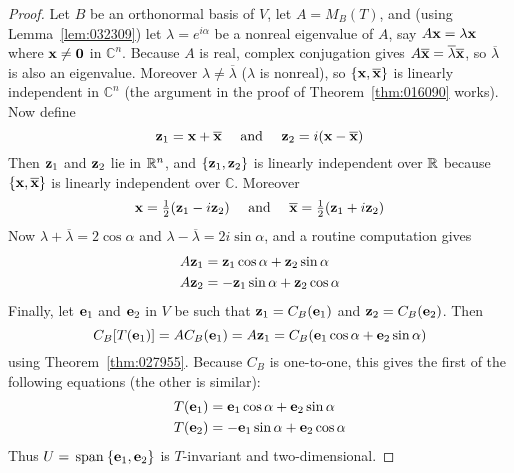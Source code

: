 \begin{proof}
Let $B$ be an orthonormal basis of $V$, let $A = M_{B}(T)$, and (using Lemma~\ref{lem:032309}) let $\lambda = e^{i\alpha}$ be a nonreal eigenvalue of $A$, say $A\textbf{x} = \lambda\textbf{x}$ where $\textbf{x} \neq \textbf{0}$ in $\mathbb{C}^n$. Because $A$ is real, complex conjugation gives $A\overline{\textbf{x}} = \overline{\lambda} \overline{\textbf{x}}$, so $ \overline{\lambda} $ is also an eigenvalue. Moreover $ \lambda \neq \overline{\lambda} $ ($\lambda$ is nonreal), so $ \{\textbf{x}, \overline{\textbf{x}} \} $ is linearly independent in $\mathbb{C}^n$ (the argument in the proof of Theorem~\ref{thm:016090} works). Now define
\begin{equation*}
\textbf{z}_1 = \textbf{x} + \overline{\textbf{x}} \quad \mbox{ and } \quad \textbf{z}_2 = i(\textbf{x} - \overline{\textbf{x}})
\end{equation*}
Then $\textbf{z}_{1}$ and $\textbf{z}_{2}$ lie in $\mathbb{R}^n$, and $\{\textbf{z}_{1}, \textbf{z}_{2}\}$ is linearly independent over $\mathbb{R}$ because $ \{\textbf{x}, \overline{\textbf{x}} \} $ is linearly independent over $\mathbb{C}$. Moreover
\begin{equation*}
\textbf{x} = \tfrac{1}{2} (\textbf{z}_1 - i \textbf{z}_2) \quad \mbox{ and } \quad \overline{\textbf{x}} = \tfrac{1}{2} (\textbf{z}_1 + i\textbf{z}_2)
\end{equation*}
Now $ \lambda + \overline{\lambda} = 2 \cos \alpha $ and $ \lambda - \overline{\lambda} = 2i \sin \alpha$, and a routine computation gives
\begin{align*}
A \textbf{z}_1 &= \textbf{z}_1 \cos \alpha + \textbf{z}_2 \sin \alpha \\
A \textbf{z}_2 &= -\textbf{z}_1 \sin \alpha + \textbf{z}_2 \cos \alpha
\end{align*}
Finally, let $\textbf{e}_{1}$ and $\textbf{e}_{2}$ in $V$ be such that $\textbf{z}_{1} = C_{B}(\textbf{e}_{1})$ and $\textbf{z}_{2} = C_{B}(\textbf{e}_{2})$. Then
\begin{equation*}
C_B[T(\textbf{e}_1)] = AC_B(\textbf{e}_1) = A\textbf{z}_1 = C_B(\textbf{e}_1 \cos \alpha + \textbf{e}_2 \sin \alpha)
\end{equation*}
using Theorem~\ref{thm:027955}. Because $C_{B}$ is one-to-one, this gives the first of the following equations (the other is similar):
\begin{align*}
T(\textbf{e}_1) &= \textbf{e}_1 \cos \alpha + \textbf{e}_2 \sin \alpha \\
T(\textbf{e}_2) &= -\textbf{e}_1 \sin \alpha + \textbf{e}_2 \cos \alpha
\end{align*}
Thus $U = \thinspace\operatorname{span\medspace}\{\textbf{e}_{1}, \textbf{e}_{2}\}$ is $T$-invariant and two-dimensional.
\end{proof}

